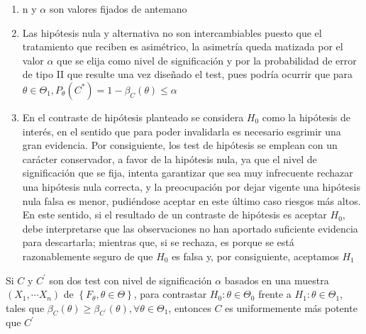 

\begin{observación}
\vspace{-2.5em}
\begin{enumerate}
\item n y $\alpha$ son valores fijados de antemano
\item Las hipótesis nula y alternativa no son intercambiables puesto que el tratamiento que reciben es asimétrico, la asimetría queda matizada por el valor $\alpha$ que se elija como nivel de significación y por la probabilidad de error de tipo II que resulte una vez diseñado el test, pues podría ocurrir que para $\theta \in \Theta_{1}, P_{\theta}\left(C^{*}\right)=1-\beta_{C}(\theta) \leq \alpha$
\item  En el contraste de hipótesis planteado se considera $H_{0}$ como la hipótesis de interés, en el sentido que para poder invalidarla es necesario esgrimir una gran evidencia. Por consiguiente, los test de hipótesis se emplean con un carácter conservador, a favor de la hipótesis nula, ya que el nivel de significación que se fija, intenta garantizar que sea muy infrecuente rechazar una hipótesis nula correcta, y la preocupación por dejar vigente una hipótesis nula falsa es menor, pudiéndose aceptar en este último caso riesgos más altos. En este sentido, si el resultado de un contraste de hipótesis es aceptar $H_{0}$, debe interpretarse que las observaciones no han aportado suficiente evidencia para descartarla; mientras que, si se rechaza, es porque se está razonablemente seguro de que $H_{0}$ es falsa y, por consiguiente, aceptamos $H_{1}$
\end{enumerate}
\end{observación}

\begin{proposición} 
Si $C$ y $C^{\prime}$ son dos test con nivel de significación $\alpha$ basados en una muestra $\left(X_{1}, \cdots X_{n}\right)$ de $\left\{F_{\theta}, \theta \in \Theta\right\}$, para contrastar $H_{0}: \theta \in \Theta_{0}$ frente a $H_{1}: \theta \in \Theta_{1}$, tales que $\beta_{C}(\theta) \geq \beta_{C^{\prime}}(\theta), \forall \theta \in \Theta_{1}$, entonces $C$ es uniformemente más potente que $C^{\prime}$    
\end{proposición}



